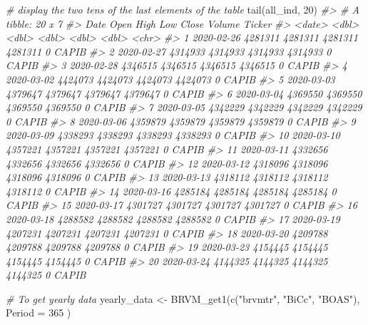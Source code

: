 \documentclass[
]{article}
\newenvironment{Shaded}{\begin{snugshade}}{\end{snugshade}}
\newcommand{\AttributeTok}[1]{\textcolor[rgb]{0.77,0.63,0.00}{#1}}
\newcommand{\CommentTok}[1]{\textcolor[rgb]{0.56,0.35,0.01}{\textit{#1}}}
\newcommand{\DecValTok}[1]{\textcolor[rgb]{0.00,0.00,0.81}{#1}}
\newcommand{\FunctionTok}[1]{\textcolor[rgb]{0.00,0.00,0.00}{#1}}
\newcommand{\NormalTok}[1]{#1}
\newcommand{\OtherTok}[1]{\textcolor[rgb]{0.56,0.35,0.01}{#1}}
\newcommand{\StringTok}[1]{\textcolor[rgb]{0.31,0.60,0.02}{#1}}
\begin{document}
\begin{Shaded}
\begin{Highlighting}[]
\CommentTok{\# display the two tens of the last elements of the table}
\FunctionTok{tail}\NormalTok{(all\_ind, }\DecValTok{20}\NormalTok{)}
\CommentTok{\#\textgreater{} \# A tibble: 20 x 7}
\CommentTok{\#\textgreater{}    Date          Open    High     Low   Close Volume Ticker}
\CommentTok{\#\textgreater{}    \textless{}date\textgreater{}       \textless{}dbl\textgreater{}   \textless{}dbl\textgreater{}   \textless{}dbl\textgreater{}   \textless{}dbl\textgreater{}  \textless{}dbl\textgreater{} \textless{}chr\textgreater{} }
\CommentTok{\#\textgreater{}  1 2020{-}02{-}26 4281311 4281311 4281311 4281311      0 CAPIB }
\CommentTok{\#\textgreater{}  2 2020{-}02{-}27 4314933 4314933 4314933 4314933      0 CAPIB }
\CommentTok{\#\textgreater{}  3 2020{-}02{-}28 4346515 4346515 4346515 4346515      0 CAPIB }
\CommentTok{\#\textgreater{}  4 2020{-}03{-}02 4424073 4424073 4424073 4424073      0 CAPIB }
\CommentTok{\#\textgreater{}  5 2020{-}03{-}03 4379647 4379647 4379647 4379647      0 CAPIB }
\CommentTok{\#\textgreater{}  6 2020{-}03{-}04 4369550 4369550 4369550 4369550      0 CAPIB }
\CommentTok{\#\textgreater{}  7 2020{-}03{-}05 4342229 4342229 4342229 4342229      0 CAPIB }
\CommentTok{\#\textgreater{}  8 2020{-}03{-}06 4359879 4359879 4359879 4359879      0 CAPIB }
\CommentTok{\#\textgreater{}  9 2020{-}03{-}09 4338293 4338293 4338293 4338293      0 CAPIB }
\CommentTok{\#\textgreater{} 10 2020{-}03{-}10 4357221 4357221 4357221 4357221      0 CAPIB }
\CommentTok{\#\textgreater{} 11 2020{-}03{-}11 4332656 4332656 4332656 4332656      0 CAPIB }
\CommentTok{\#\textgreater{} 12 2020{-}03{-}12 4318096 4318096 4318096 4318096      0 CAPIB }
\CommentTok{\#\textgreater{} 13 2020{-}03{-}13 4318112 4318112 4318112 4318112      0 CAPIB }
\CommentTok{\#\textgreater{} 14 2020{-}03{-}16 4285184 4285184 4285184 4285184      0 CAPIB }
\CommentTok{\#\textgreater{} 15 2020{-}03{-}17 4301727 4301727 4301727 4301727      0 CAPIB }
\CommentTok{\#\textgreater{} 16 2020{-}03{-}18 4288582 4288582 4288582 4288582      0 CAPIB }
\CommentTok{\#\textgreater{} 17 2020{-}03{-}19 4207231 4207231 4207231 4207231      0 CAPIB }
\CommentTok{\#\textgreater{} 18 2020{-}03{-}20 4209788 4209788 4209788 4209788      0 CAPIB }
\CommentTok{\#\textgreater{} 19 2020{-}03{-}23 4154445 4154445 4154445 4154445      0 CAPIB }
\CommentTok{\#\textgreater{} 20 2020{-}03{-}24 4144325 4144325 4144325 4144325      0 CAPIB}

\CommentTok{\# To get yearly data}
\NormalTok{yearly\_data }\OtherTok{\textless{}{-}} \FunctionTok{BRVM\_get1}\NormalTok{(}\FunctionTok{c}\NormalTok{(}\StringTok{"brvmtr"}\NormalTok{, }\StringTok{"BiCc"}\NormalTok{, }\StringTok{"BOAS"}\NormalTok{), }\AttributeTok{Period =} \DecValTok{365}\NormalTok{ ) }


\end{Highlighting}
\end{Shaded}
\end{document}
